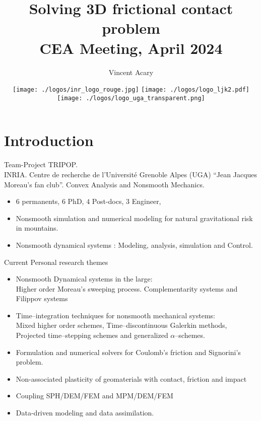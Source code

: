 \documentclass[8pt,red]{beamer}
\title[Solving  3D frictional contact problem]{Solving  3D frictional contact problem \\[5mm]
  \large{CEA Meeting, April 2024}}
\author{Vincent Acary}
\date{
   \texttt{[image: ./logos/inr\_logo\_rouge.jpg]}\hfill
   \texttt{[image: ./logos/logo\_ljk2.pdf]}\hfill
   \texttt{[image: ./logos/logo\_uga\_transparent.png]}\\
  
 }
\institute{Inria -  Centre de l'Université Grenoble Alpes - Laboratoire Jean Kuntzmann}
\begin{document}
\frame{\titlepage
}


\section{Introduction}

\begin{frame}
  \begin{block}
    {Team-Project TRIPOP.\\ INRIA. Centre de recherche de l'Université Grenoble Alpes (UGA)}
    ``Jean Jacques Moreau's fan club''. Convex Analysis and Nonsmooth Mechanics.
    \begin{itemize}
    \item $6$ permanents, $6$ PhD, $4$ Post-docs, $3$ Engineer,
    \item Nonsmooth simulation and numerical modeling for natural gravitational risk in mountains.
    \item Nonsmooth dynamical systems :
      Modeling, analysis, simulation and Control.
    \end{itemize}
  \end{block}
    \begin{block}
      {Current Personal research themes}
    \begin{itemize}
    \item Nonsmooth Dynamical systems in the large:\\
      Higher order Moreau's sweeping process. Complementarity systems and Filippov systems
    \item Time--integration techniques for nonsmooth mechanical systems:\\ Mixed higher order schemes, Time--discontinuous Galerkin methods, Projected time--stepping schemes and generalized $\alpha$--schemes.
    \item Formulation and numerical solvers for Coulomb's friction and Signorini's problem.%
    \item Non-associated plasticity of geomaterials with contact, friction and impact
    \item Coupling SPH/DEM/FEM and MPM/DEM/FEM
    \item Data-driven modeling and data assimilation.
    \end{itemize}
  \end{block}
\end{frame}
\end{document}
